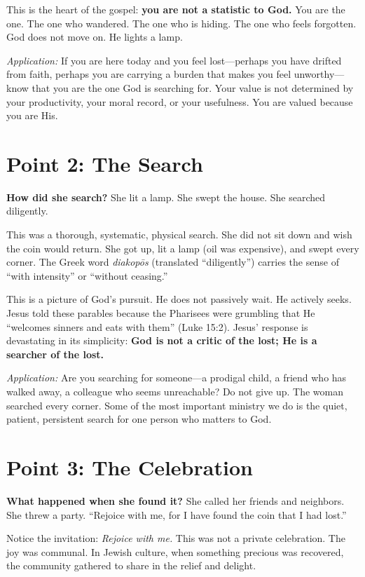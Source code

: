 \documentclass[
    language=english,
    doctype=sermon,
    institution=none,
]{../../omnilatex}
\begin{document}
This is the heart of the gospel: \textbf{you are not a statistic to God.} You are the one. The one who wandered. The one who is hiding. The one who feels forgotten. God does not move on. He lights a lamp.

\bigskip
\noindent\textit{Application:} If you are here today and you feel lost---perhaps you have drifted from faith, perhaps you are carrying a burden that makes you feel unworthy---know that you are the one God is searching for. Your value is not determined by your productivity, your moral record, or your usefulness. You are valued because you are His.

\section{Point 2: The Search}

\textbf{How did she search?} She lit a lamp. She swept the house. She searched diligently.

This was a thorough, systematic, physical search. She did not sit down and wish the coin would return. She got up, lit a lamp (oil was expensive), and swept every corner. The Greek word \emph{diakopōs} (translated ``diligently'') carries the sense of ``with intensity'' or ``without ceasing.''

This is a picture of God's pursuit. He does not passively wait. He actively seeks. Jesus told these parables because the Pharisees were grumbling that He ``welcomes sinners and eats with them'' (Luke 15:2). Jesus' response is devastating in its simplicity: \textbf{God is not a critic of the lost; He is a searcher of the lost.}

\bigskip
\noindent\textit{Application:} Are you searching for someone---a prodigal child, a friend who has walked away, a colleague who seems unreachable? Do not give up. The woman searched every corner. Some of the most important ministry we do is the quiet, patient, persistent search for one person who matters to God.

\section{Point 3: The Celebration}

\textbf{What happened when she found it?} She called her friends and neighbors. She threw a party. ``Rejoice with me, for I have found the coin that I had lost.''

Notice the invitation: \textit{Rejoice with me.} This was not a private celebration. The joy was communal. In Jewish culture, when something precious was recovered, the community gathered to share in the relief and delight.
\end{document}
